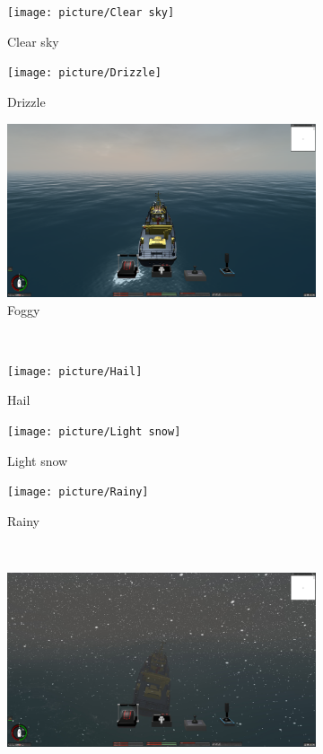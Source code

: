 \documentclass[a4paper,10pt]{article}
\begin{document}
\begin{figure}[htbp]
			\begin{subfigure}{0.3\textwidth}
				\texttt{[image: picture/Clear sky]}
				\captionsetup{font=scriptsize}
				\caption{Clear sky}
				\label{fig: Clear sky}
			\end{subfigure}
			\begin{subfigure}{0.3\textwidth}
				\texttt{[image: picture/Drizzle]}
				\captionsetup{font=scriptsize}
				\caption{Drizzle}
				\label{fig: Drizzle}
			\end{subfigure}
			\begin{subfigure}{0.3\textwidth}
				\includegraphics[width=\linewidth]{picture/Foggy}
				\captionsetup{font=scriptsize}
				\caption{Foggy}
				\label{fig: Foggy}	
			\end{subfigure}\\
			\begin{subfigure}{0.3\textwidth}
				\texttt{[image: picture/Hail]}
				\captionsetup{font=scriptsize}
				\caption{Hail}
				\label{fig: Hail}	
			\end{subfigure}
			\begin{subfigure}{0.3\textwidth}
				\texttt{[image: picture/Light snow]}
				\captionsetup{font=scriptsize}
				\caption{Light snow}
				\label{fig: Light snow}
			\end{subfigure}
			\begin{subfigure}{0.3\textwidth}
				\texttt{[image: picture/Rainy]}
				\captionsetup{font=scriptsize}
				\caption{Rainy}
				\label{fig: Rainy}
			\end{subfigure}\\
			\begin{subfigure}{0.3\textwidth}
				\includegraphics[width=\linewidth]{picture/Snow storm}

\end{subfigure}
\end{figure}
\end{document}
